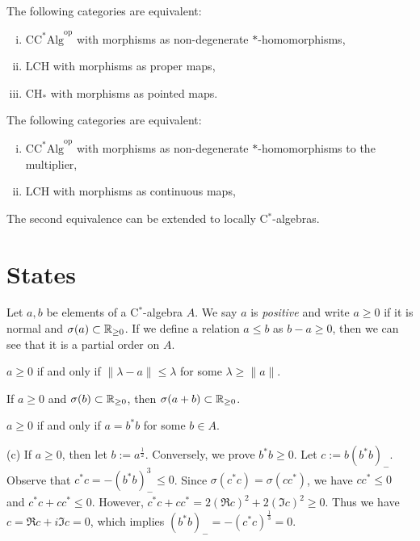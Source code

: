 \documentclass{../../large}
\begin{document}
\begin{prb}
The following categories are equivalent:
\begin{enumerate}[(i)]
\item $\mathrm{CC^*Alg}^{\mathrm{op}}$ with morphisms as non-degenerate $*$-homomorphisms,
\item $\mathrm{LCH}$ with morphisms as proper maps,
\item $\mathrm{CH}_*$ with morphisms as pointed maps.
\end{enumerate}
The following categories are equivalent:
\begin{enumerate}[(i)]
\item $\mathrm{CC^*Alg}^{\mathrm{op}}$ with morphisms as non-degenerate $*$-homomorphisms to the multiplier,
\item $\mathrm{LCH}$ with morphisms as continuous maps,
\end{enumerate}
The second equivalence can be extended to locally C$^*$-algebras.
\end{prb}

\section{States}


\begin{prb}
Let $a,b$ be elements of a C$^*$-algebra $A$.
We say $a$ is \emph{positive} and write $a\ge0$ if it is normal and $\sigma(a)\subset\mathbb{R}_{\ge0}$.
If we define a relation $a\le b$ as $b-a\ge0$, then we can see that it is a partial order on $A$.
\begin{parts}
\item $a\ge0$ if and only if $\|\lambda-a\|\le\lambda$ for some $\lambda\ge\|a\|$.
\item If $a\ge0$ and $\sigma(b)\subset\mathbb{R}_{\ge0}$, then $\sigma(a+b)\subset\mathbb{R}_{\ge0}$.
\item $a\ge0$ if and only if $a=b^*b$ for some $b\in A$.
\end{parts}
\end{prb}
\begin{pf}
(c)
If $a\ge0$, then let $b:=a^{\frac12}$.
Conversely, we prove $b^*b\ge0$.
Let $c:=b(b^*b)_-$.
Observe that $c^*c=-(b^*b)_-^3\le0$.
Since $\sigma(c^*c)=\sigma(cc^*)$, we have $cc^*\le0$ and $c^*c+cc^*\le0$.
However, $c^*c+cc^*=2(\Re c)^2+2(\Im c)^2\ge0$.
Thus we have $c=\Re c+i\Im c=0$, which implies $(b^*b)_-=-(c^*c)^{\frac13}=0$.
\end{pf}
\end{document}
